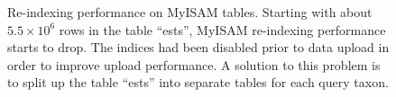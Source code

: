 \begin{figure}[h]
\centering
\def\svgwidth{0.8\textwidth}

\caption[Re-indexing performance on MyISAM tables]{
	Re-indexing performance on MyISAM tables. Starting with about $5.5\times10^6$
	rows in the table ``ests'', MyISAM re-indexing performance starts to drop.
	The indices had been disabled prior to data upload in order to improve upload
	performance. A solution to this problem is to split up the table ``ests'' into
	separate tables for each query taxon.
}
\label{fig:transaction-time}
\end{figure}

